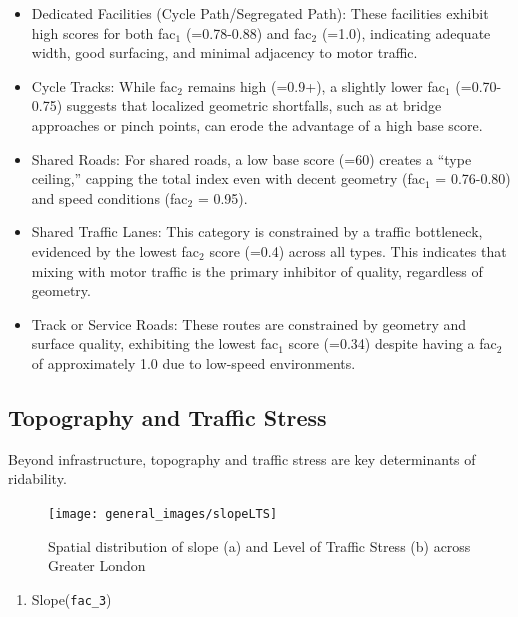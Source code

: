 \documentclass[
  12pt,
  oneside]{book}
\providecommand{\tightlist}{%
  \setlength{\itemsep}{0pt}\setlength{\parskip}{0pt}}
\begin{document}
\begin{itemize}
\item
  Dedicated Facilities (Cycle Path/Segregated Path): These facilities exhibit high scores for both fac\(_1\) (=0.78-0.88) and fac\(_2\) (=1.0), indicating adequate width, good surfacing, and minimal adjacency to motor traffic.
\item
  Cycle Tracks: While fac\(_2\) remains high (=0.9+), a slightly lower fac\(_1\) (=0.70-0.75) suggests that localized geometric shortfalls, such as at bridge approaches or pinch points, can erode the advantage of a high base score.
\item
  Shared Roads: For shared roads, a low base score (=60) creates a ``type ceiling,'' capping the total index even with decent geometry (fac\(_1\) = 0.76-0.80) and speed conditions (fac\(_2\) = 0.95).
\item
  Shared Traffic Lanes: This category is constrained by a traffic bottleneck, evidenced by the lowest fac\(_2\) score (=0.4) across all types. This indicates that mixing with motor traffic is the primary inhibitor of quality, regardless of geometry.
\item
  Track or Service Roads: These routes are constrained by geometry and surface quality, exhibiting the lowest fac\(_1\) score (=0.34) despite having a fac\(_2\) of approximately 1.0 due to low-speed environments.
\end{itemize}

\subsection{Topography and Traffic Stress}\label{topography-and-traffic-stress}

Beyond infrastructure, topography and traffic stress are key determinants of ridability.

\begin{figure}

{\centering \texttt{[image: general\_images/slopeLTS]} 

}

\caption{Spatial distribution of slope (a) and Level of Traffic Stress (b) across Greater London}\label{fig:slopeLTS}
\end{figure}

\begin{enumerate}
\def\labelenumi{\arabic{enumi}.}
\tightlist
\item
  Slope(\texttt{fac\_3})
\end{enumerate}
\end{document}
